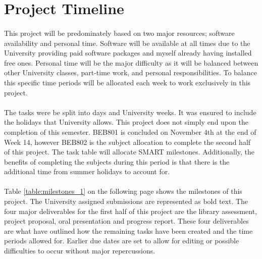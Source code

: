 \newpage
\section{Project Timeline}

\paragraph{}
This project will be predominately based on two major resources; software availability and personal time. Software will be available at all times due to the University providing paid software packages and myself already having installed free ones. Personal time will be the major difficulty as it will be balanced between other University classes, part-time work, and personal responsibilities. To balance this specific time periods will be allocated each week to work exclusively in this project.    

\paragraph{}
The tasks were be split into days and University weeks. It was ensured to include the holidays that University allows. This project does not simply end upon the completion of this semester. BEB801 is concluded on November 4th at the end of Week 14, however BEB802 is the subject allocation to complete the second half of this project. The task table will allocate SMART milestones. Additionally, the benefits of completing the subjects during this period is that there is the additional time from summer holidays to account for.

\paragraph{}
Table \ref{table:milestones_1} on the following page shows the milestones of this project. The University assigned submissions are represented as bold text. The four major deliverables for the first half of this project are the library assessment, project proposal, oral presentation and progress report. These four deliverables are what have outlined how the remaining tasks have been created and the time periods allowed for. Earlier due dates are set to allow for editing or possible difficulties to occur without major repercussions. 

